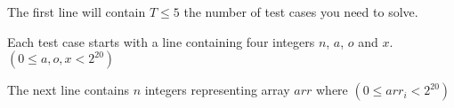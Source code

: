 The first line will contain $T \le 5$ the number of test cases you need to solve.

Each test case starts with a line containing four integers $n$, $a$, $o$ and $x$. $(0 \le a , o , x < 2^{20})$

The next line contains $n$ integers representing array $arr$ where $(0 \leq arr_i < 2^{20})$
